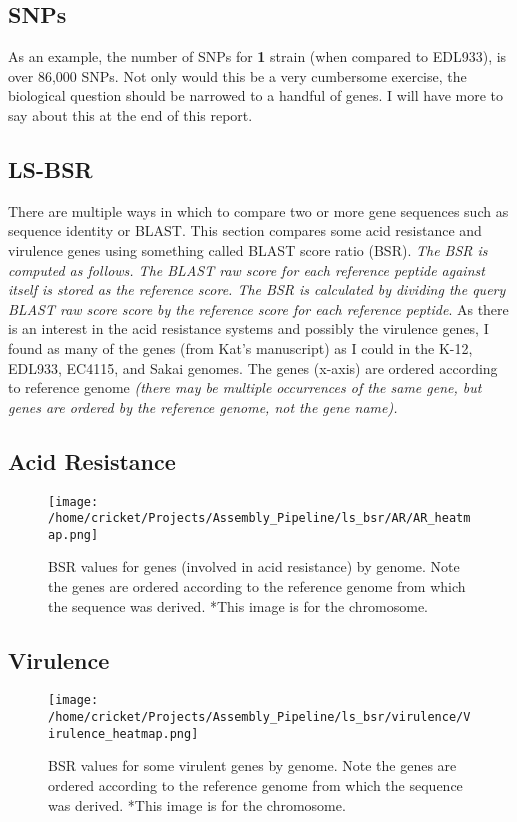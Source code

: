 \documentclass[11pt]{article}
\begin{document}
\subsection*{SNPs}
As an example, the number of SNPs for \textbf{1} strain (when compared to EDL933), is over 86,000 SNPs. Not only would this be a very cumbersome exercise, the biological question should be narrowed to a handful of genes. I will have more to say about this at the end of this report. \\

\subsection*{LS-BSR}
There are multiple ways in which to compare two or more gene sequences such as sequence identity or BLAST. This section compares some acid resistance and virulence genes using something called BLAST score ratio (BSR). \textit{The BSR is computed as follows. The BLAST raw score for each reference peptide against itself is stored as the reference score. The BSR is calculated by dividing the query BLAST raw score score by the reference score for each reference peptide}. As there is an interest in the acid resistance systems and possibly the virulence genes, I found as many of the genes (from Kat's manuscript) as I could in the K-12, EDL933, EC4115, and Sakai genomes. The genes (x-axis) are ordered according to reference genome \textit{(there may be multiple occurrences of the same gene, but genes are ordered by the reference genome, not the gene name).}

\subsection*{Acid Resistance}
\begin{figure}[h!]\normalsize %
\centering
\texttt{[image: /home/cricket/Projects/Assembly\_Pipeline/ls\_bsr/AR/AR\_heatmap.png]}
\caption{BSR values for genes (involved in acid resistance) by genome. Note the genes are ordered according to the reference genome from which the sequence was derived. *This image is for the chromosome.}
\label{ARheatmap}
\end{figure}
\clearpage

\subsection*{Virulence}
\begin{figure}[ht!]\normalsize %
\centering
\texttt{[image: /home/cricket/Projects/Assembly\_Pipeline/ls\_bsr/virulence/Virulence\_heatmap.png]}
\caption{BSR values for some virulent genes by genome. Note the genes are ordered according to the reference genome from which the sequence was derived. *This image is for the chromosome.}
\label{VirrulenceHeatMap}
\end{figure}
\end{document}
